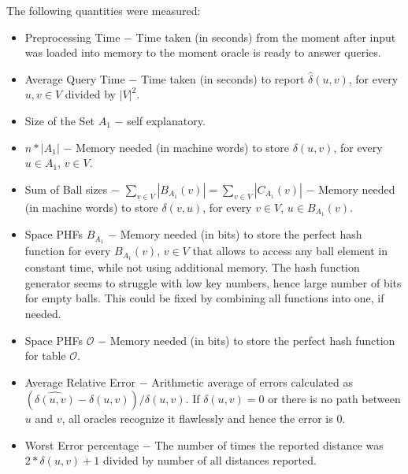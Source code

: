 \documentclass[shortabstract, lic, english]{iithesis}
\theoremstyle{definition} \newtheorem{definition}{Definition}[chapter]
\theoremstyle{remark} \newtheorem{remark}[definition]{Observation}
\theoremstyle{plain} \newtheorem{theorem}[definition]{Theorem}
\theoremstyle{plain} \newtheorem{lemma}[definition]{Lemma}
\theoremstyle{plain} \newtheorem{conjecture}[definition]{Conjecture}
\begin{document}
The following quantities were measured:
\begin{itemize}
    \item Preprocessing Time $-$ Time taken (in seconds) from the moment after input was loaded into memory to the moment oracle is ready to answer queries.
    \item Average Query Time $-$ Time taken (in seconds) to report $\hat{\delta}(u, v)$, for every $u, v \in V$ divided by $|V|^2$.
    \item Size of the Set $A_1$ $-$ self explanatory.
    \item $n*|A_1|$ $-$ Memory needed (in machine words) to store $\delta(u, v)$, for every $u \in A_1$, $v \in V$.
    \item Sum of Ball sizes $-$ $\sum_{v \in V} |B_{A_1}(v)| = \sum_{v \in V} |C_{A_1}(v)|$ $-$ Memory needed (in machine words) to store $\delta(v, u)$, for every $v \in V$, $u \in B_{A_1}(v)$.
    \item Space PHFs $B_{A_1}$ $-$ Memory needed (in bits) to store the perfect hash function for every $B_{A_1}(v)$, $v \in V$ that allows to access any ball element in constant time, while not using additional memory. 
            The hash function generator seems to struggle with low key numbers, hence large number of bits for empty balls. This could be fixed by combining all functions into one, if needed.
    \item Space PHFs $\mathcal{O}$  $-$ Memory needed (in bits) to store the perfect hash function for table $\mathcal{O}$.
    \item Average Relative Error $-$ Arithmetic average of errors calculated\newline 
            as $(\hat{\delta(u,v)} - \delta(u,v)) / \delta(u,v)$.
            If $\delta(u,v) = 0$ or there is no path between $u$ and $v$, all oracles recognize it flawlessly and hence the error is $0$.
    \item Worst Error percentage $-$ The number of times the reported distance was $2*\delta(u, v) + 1$ divided by number of all distances reported.
\end{itemize}
\end{document}
